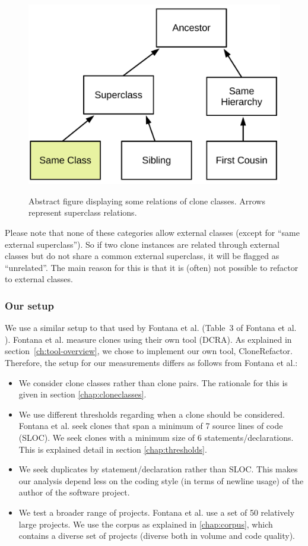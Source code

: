 \documentclass[a4paper]{article}
\begin{document}
\begin{figure}[H]
  \caption{Abstract figure displaying some relations of clone classes. Arrows represent superclass relations.}
    \medskip
    \includegraphics[width=1\columnwidth]{img/Relation}
  \label{fig:clonerelation}
\end{figure}
Please note that none of these categories allow external classes (except for ``same external superclass''). So if two clone instances are related through external classes but do not share a common external superclass, it will be flagged as ``unrelated''. The main reason for this is that it is (often) not possible to refactor to external classes.

\subsubsection{Our setup}\label{chap:oursetup}
We use a similar setup to that used by Fontana et al. (Table~3 of Fontana et al. \cite{fontana2015duplicated}). Fontana et al. measure clones using their own tool (DCRA). As explained in section~\ref{ch:tool-overview}, we chose to implement our own tool, CloneRefactor. Therefore, the setup for our measurements differs as follows from Fontana et al.:
\begin{itemize}
  \item We consider clone classes rather than clone pairs. The rationale for this is given in section \ref{chap:cloneclasses}.
\item We use different thresholds regarding when a clone should be considered. Fontana et al. seek clones that span a minimum of 7 source lines of code (SLOC). We seek clones with a minimum size of 6 statements/declarations. This is explained detail in section \ref{chap:thresholds}.
\item We seek duplicates by statement/declaration rather than SLOC. This makes our analysis depend less on the coding style (in terms of newline usage) of the author of the software project.
\item We test a broader range of projects. Fontana et al. use a set of 50 relatively large projects. We use the corpus as explained in \ref{chap:corpus}, which contains a diverse set of projects (diverse both in volume and code quality).
\end{itemize}
\end{document}
